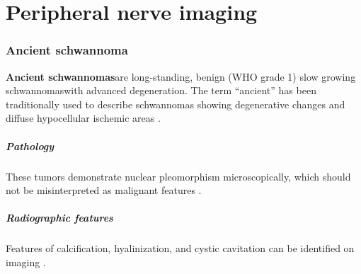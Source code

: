 \chapter{Peripheral nerve imaging}

\subsection{Ancient schwannoma}

\textbf{Ancient schwannomas}are long-standing, benign (WHO grade 1) slow growing schwannomaswith advanced degeneration. The term ``ancient'' has been traditionally used to describe schwannomas showing degenerative changes and diffuse hypocellular ischemic areas .

\paragraph{Pathology}

These tumors demonstrate nuclear pleomorphism microscopically, which should not be misinterpreted as malignant features .

\paragraph{Radiographic features}

Features of calcification, hyalinization, and cystic cavitation can be identified on imaging .